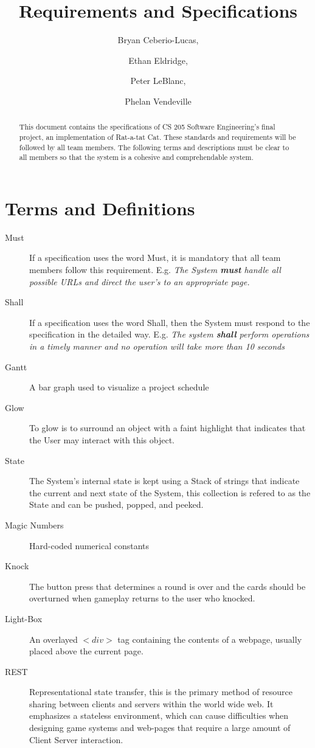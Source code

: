 \documentclass[12pt]{IEEEtran}
\title{Requirements and Specifications}
\author{Bryan Ceberio-Lucas, \and Ethan Eldridge, \and Peter LeBlanc, \and Phelan Vendeville }
\begin{document}
\maketitle

\begin{abstract}
	This document contains the specifications of CS 205 Software  Engineering's final project, an implementation of Rat-a-tat Cat. These standards and requirements will be followed by all team members. The following terms and descriptions must be clear to all members so that the system is a cohesive and comprehendable system.
\end{abstract}

\tableofcontents

\section{Terms and Definitions}
\label{sec:TermsDefinitions}
	\begin{description}
		\item[Must] If a specification uses the word Must, it is mandatory that all team members follow this requirement. E.g.  \textit{The System \textbf{must} handle all possible URLs and direct the user's to an appropriate page.} 
		\item[Shall] If a specification uses the word Shall, then the System must respond to the specification in the detailed way. E.g. \textit{The system \textbf{shall} perform operations in a timely manner and no operation will take more than 10 seconds}
		\item[Gantt] A bar graph used to visualize a project schedule
		\item[Glow] To glow is to surround an object with a faint highlight that indicates that the User may interact with this object.
		\item[State] The System's internal state is kept using a Stack of strings that indicate the current and next state of the System, this collection is refered to as the State and can be pushed, popped, and 	peeked.
		\item[Magic Numbers] \hspace{4em} Hard-coded numerical constants 
		\item[Knock] \hspace{.5em} The button press that determines a round is over and the cards should be overturned when gameplay returns to the user who knocked.
		\item[Light-Box] \hspace{2em}An overlayed $<div>$ tag containing the contents of a webpage, usually placed above the current page.
		\item[REST] Representational state transfer, this is the primary method of resource sharing between clients and servers within the world wide web. It emphasizes a stateless environment, which can cause difficulties when designing game systems and web-pages that require a large amount of Client Server interaction.
	\end{description}
\end{document}
